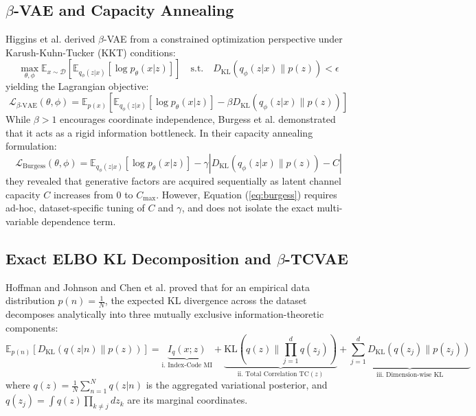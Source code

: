\documentclass[11pt,a4paper]{article}
\begin{document}
\subsection{\texorpdfstring{$\beta$}{Beta}-VAE and Capacity Annealing}
Higgins et al. \cite{higgins2017beta} derived $\beta$-VAE from a constrained optimization perspective under Karush-Kuhn-Tucker (KKT) conditions:
\begin{equation}
\max_{\theta, \phi} \mathbb{E}_{x \sim \mathcal{D}} \left[ \mathbb{E}_{q_\phi(z|x)}[\log p_\theta(x|z)] \right] \quad \text{s.t.} \quad D_{\text{KL}}(q_\phi(z|x) \parallel p(z)) < \epsilon
\label{eq:beta_constraint}
\end{equation}
yielding the Lagrangian objective:
\begin{equation}
\mathcal{L}_{\beta\text{-VAE}}(\theta, \phi) = \mathbb{E}_{p(x)}\left[ \mathbb{E}_{q_\phi(z|x)}[\log p_\theta(x|z)] - \beta D_{\text{KL}}(q_\phi(z|x) \parallel p(z)) \right]
\label{eq:beta_vae}
\end{equation}
While $\beta > 1$ encourages coordinate independence, Burgess et al. \cite{burgess2018understanding} demonstrated that it acts as a rigid information bottleneck. In their capacity annealing formulation:
\begin{equation}
\mathcal{L}_{\text{Burgess}}(\theta, \phi) = \mathbb{E}_{q_\phi(z|x)}[\log p_\theta(x|z)] - \gamma \left| D_{\text{KL}}(q_\phi(z|x) \parallel p(z)) - C \right|
\label{eq:burgess}
\end{equation}
they revealed that generative factors are acquired sequentially as latent channel capacity $C$ increases from 0 to $C_{\text{max}}$. However, Equation (\ref{eq:burgess}) requires ad-hoc, dataset-specific tuning of $C$ and $\gamma$, and does not isolate the exact multi-variable dependence term.

\subsection{Exact ELBO KL Decomposition and \texorpdfstring{$\beta$}{Beta}-TCVAE}
Hoffman and Johnson \cite{hoffman2016elbo} and Chen et al. \cite{chen2018isolating} proved that for an empirical data distribution $p(n) = \frac{1}{N}$, the expected KL divergence across the dataset decomposes analytically into three mutually exclusive information-theoretic components:
\begin{equation}
\mathbb{E}_{p(n)} \left[ D_{\text{KL}}(q(z|n) \parallel p(z)) \right] = \underbrace{I_q(x; z)}_{\text{i. Index-Code MI}} + \underbrace{\text{KL}\left(q(z) \parallel \prod_{j=1}^d q(z_j)\right)}_{\text{ii. Total Correlation } \text{TC}(z)} + \underbrace{\sum_{j=1}^d D_{\text{KL}}(q(z_j) \parallel p(z_j))}_{\text{iii. Dimension-wise KL}}
\label{eq:decomposition}
\end{equation}
where $q(z) = \frac{1}{N}\sum_{n=1}^N q(z|n)$ is the aggregated variational posterior, and $q(z_j) = \int q(z) \prod_{k \ne j} dz_k$ are its marginal coordinates.
\end{document}
